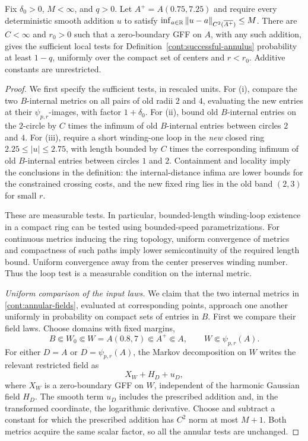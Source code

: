 \begin{lemma}\label{cont:single-annulus}
Fix $\delta_0>0$, $M<\infty$, and $q>0$.  Let
$A^+=A(0.75,7.25)$ and require every deterministic smooth addition $u$ to
satisfy $\inf_{a\in\mathbb R}\|u-a\|_{C^2(\overline{A^+})}\le M$.
There are $C<\infty$ and
$r_0>0$ such that a zero-boundary GFF on $A$, with any such addition, gives
the sufficient local tests for Definition~\ref{cont:successful-annulus}
probability at least $1-q$, uniformly over the compact set of centers and
$r<r_0$.  Additive constants are unrestricted.
\end{lemma}

\begin{proof}
We first specify the sufficient tests, in rescaled units.  For (i), compare
the two $B$-internal metrics on all pairs of old radii $2$ and $4$, evaluating
the new entries at their $\psi_{p,r}$-images, with factor $1+\delta_0$.
For (ii), bound old $B$-internal entries on the $2$-circle by $C$ times the
infimum of old $B$-internal entries between circles $2$ and $4$.  For (iii),
require a short winding-one loop in the \emph{new} closed ring
$2.25\leq|u|\leq2.75$, with length bounded by $C$ times the corresponding
infimum of old $B$-internal entries between circles $1$ and $2$.
Containment and locality imply the conclusions in the definition: the
internal-distance infima are lower bounds for the constrained crossing
costs, and the new fixed ring lies in the old band $(2,3)$ for small $r$.

These are measurable tests.  In particular, bounded-length winding-loop
existence in a compact ring can be tested using bounded-speed
parametrizations.  For continuous metrics inducing the ring topology,
uniform convergence of metrics and compactness of such paths imply lower
semicontinuity of the required length bound.  Uniform convergence away
from the center preserves winding number.  Thus the loop test is a
measurable condition on the internal metric.

\emph{Uniform comparison of the input laws.}
We claim that the two internal metrics in \eqref{cont:annular-fields},
evaluated at corresponding points, approach one another uniformly in
probability on compact sets of entries in $B$.  First we compare their
field laws.  Choose domains with fixed margins,
\[
 B\Subset W_0\Subset W=A(0.8,7)\Subset A^+\Subset A,
 \qquad W\Subset\psi_{p,r}(A).
\]
For either $D=A$ or $D=\psi_{p,r}(A)$, the Markov decomposition on $W$
writes the relevant restricted field as
\[
 X_W+H_D+u_D,
\]
where $X_W$ is a zero-boundary GFF on $W$, independent of the harmonic
Gaussian field $H_D$.  The smooth term $u_D$ includes the prescribed
addition and, in the transformed coordinate, the logarithmic derivative.
Choose and subtract a constant for which the prescribed addition has
$C^2$ norm at most $M+1$.  Both metrics acquire the same scalar factor,
so all the annular tests are unchanged.


\end{proof}
